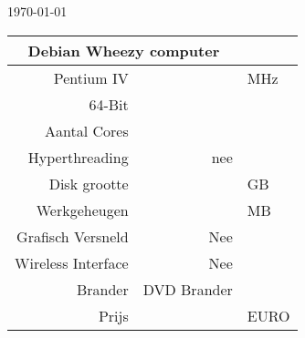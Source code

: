 \documentclass[a4paper,14pt]{extarticle}
\begin{document}
\centerline{\today}
\vskip 0.5cm
\begin{center}
\begin{tabular}{ |r| r| l| }
	\multicolumn{2}{c}{\Huge{Debian Wheezy computer}}\\
	\hline
	Pentium IV & \cpuspeed{} & MHz \\
	64-Bit & \bitssixtyfour{} & \\
	Aantal Cores & \corecount{} & \\
	Hyperthreading & nee & \\
	Disk grootte & \disksize{} & GB \\
	Werkgeheugen & \memsize{} & MB \\
	Grafisch Versneld & Nee & \\
	Wireless Interface & Nee & \\
	Brander & DVD Brander & \\
	Prijs		& \price{} & EURO \\
\end{tabular}
\end{center}
\end{document}
